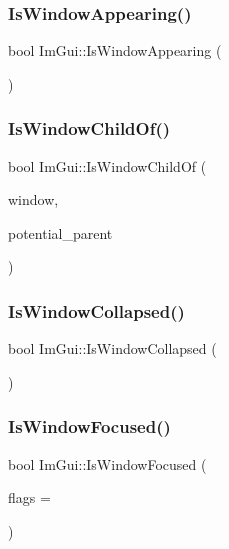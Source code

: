 \subsubsection{\texorpdfstring{Is\+Window\+Appearing()}{IsWindowAppearing()}}
{\footnotesize\ttfamily bool Im\+Gui\+::\+Is\+Window\+Appearing (\begin{DoxyParamCaption}{ }\end{DoxyParamCaption})}

\hypertarget{namespace_im_gui_a2ca7721bfc85f5e98c212c2e9ad793b5}{}\label{namespace_im_gui_a2ca7721bfc85f5e98c212c2e9ad793b5} 
\subsubsection{\texorpdfstring{Is\+Window\+Child\+Of()}{IsWindowChildOf()}}
{\footnotesize\ttfamily bool Im\+Gui\+::\+Is\+Window\+Child\+Of (\begin{DoxyParamCaption}\item[{\hyperlink{struct_im_gui_window}{Im\+Gui\+Window} $\ast$}]{window,  }\item[{\hyperlink{struct_im_gui_window}{Im\+Gui\+Window} $\ast$}]{potential\+\_\+parent }\end{DoxyParamCaption})}

\hypertarget{namespace_im_gui_a2a6492aea9013c0078fc530a66e11768}{}\label{namespace_im_gui_a2a6492aea9013c0078fc530a66e11768} 
\subsubsection{\texorpdfstring{Is\+Window\+Collapsed()}{IsWindowCollapsed()}}
{\footnotesize\ttfamily bool Im\+Gui\+::\+Is\+Window\+Collapsed (\begin{DoxyParamCaption}{ }\end{DoxyParamCaption})}

\hypertarget{namespace_im_gui_a51ed119ab4be7fcf47a34644e262c87e}{}\label{namespace_im_gui_a51ed119ab4be7fcf47a34644e262c87e} 
\subsubsection{\texorpdfstring{Is\+Window\+Focused()}{IsWindowFocused()}}
{\footnotesize\ttfamily bool Im\+Gui\+::\+Is\+Window\+Focused (\begin{DoxyParamCaption}\item[{Im\+Gui\+Focused\+Flags}]{flags = {} }\end{DoxyParamCaption})}

